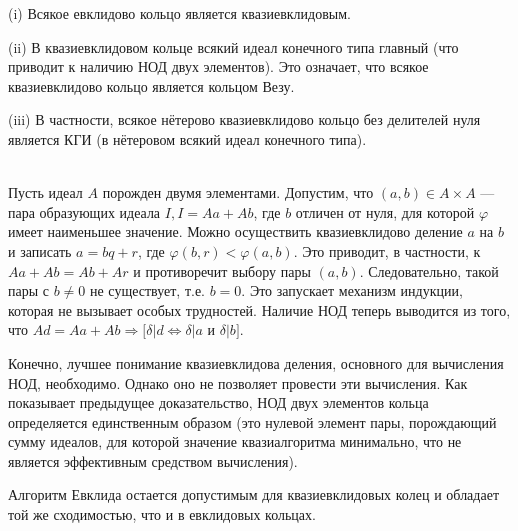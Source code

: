 \begin{predl}
\hspace*{0.5cm}
(i) Всякое евклидово кольцо является квазиевклидовым.

(ii) В квазиевклидовом кольце всякий идеал конечного типа главный (что приводит к наличию НОД двух элементов). Это означает, что всякое квазиевклидово кольцо является кольцом Везу.

(iii) В частности, всякое нётерово квазиевклидово кольцо без дели­телей нуля является КГИ (в нётеровом всякий идеал конечного типа).
\end{predl}
\begin{myproof}
\\
Пусть идеал $A$ порожден двумя элементами. Допустим, что
$(a, b)\in A \times A$ — пара образующих идеала $I, I = Aa + Ab$, где $b$
отличен от нуля, для которой $\varphi$ имеет наименьшее значение. Мож­но осуществить квазиевклидово деление $a$ на $b$ и записать $a=bq+r$,
где $\varphi(b,r) < \varphi(a, b)$. Это приводит, в частности, к $Aa+Ab=Ab+Ar$
и противоречит выбору пары $(a,b)$. Следовательно, такой пары с
$b\neq0$ не существует, т.е. $b=0$. Это запускает механизм индукции,
которая не вызывает особых трудностей. Наличие НОД теперь выводится из того, что $Ad = Aa + Ab \Rightarrow[\delta|d \Longleftrightarrow \delta|a$ и $\delta|b]$.
\end{myproof}
\newpage
\begin{mynotice}
Конечно, лучшее понимание квазиевклидова деления, основного для вычисления НОД, необходимо. Однако оно
не позволяет провести эти вычисления. Как показывает преды­дущее доказательство, НОД двух элементов кольца определяется
единственным образом (это нулевой элемент пары, порождающий
сумму идеалов, для которой значение квазиалгоритма минималь­но, что не является эффективным средством вычисления).\\
\end{mynotice}

Алгоритм Евклида остается допустимым для квазиевклидовых ко­лец и обладает той же сходимостью, что и в евклидовых кольцах.

